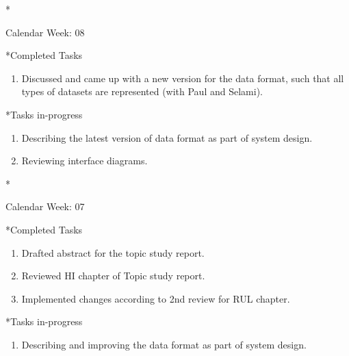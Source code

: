 \documentclass[11pt,a4paper]{article}
\begin{document}
\newpage
\begin{section}*{Calendar Week: 08  \hfill \date{26 February, 2021}}
 \begin{refsection}
     \begin{subsection}*{Completed Tasks}
         \begin{enumerate}
             \item
                   Discussed and came up with a new version for the data format, such that all types of datasets are represented (with Paul and Selami).
         \end{enumerate}
     \end{subsection}
     \begin{subsection}*{Tasks in-progress}
         \begin{enumerate}
             \item
                   Describing the latest version of data format as part of system design.
             \item
                   Reviewing interface diagrams.
         \end{enumerate}
     \end{subsection}
 \end{refsection}
\end{section}

\newpage
\begin{section}*{Calendar Week: 07  \hfill \date{19 February, 2021}}
 \begin{refsection}
     \begin{subsection}*{Completed Tasks}
         \begin{enumerate}
             \item
                   Drafted abstract for the topic study report.
             \item
                   Reviewed HI chapter of Topic study report.
             \item
                   Implemented changes according to 2nd review for RUL chapter.
         \end{enumerate}
     \end{subsection}
     \begin{subsection}*{Tasks in-progress}
         \begin{enumerate}
             \item
                   Describing and improving the data format as part of system design.
         \end{enumerate}
     \end{subsection}
 \end{refsection}
\end{section}
\end{document}
